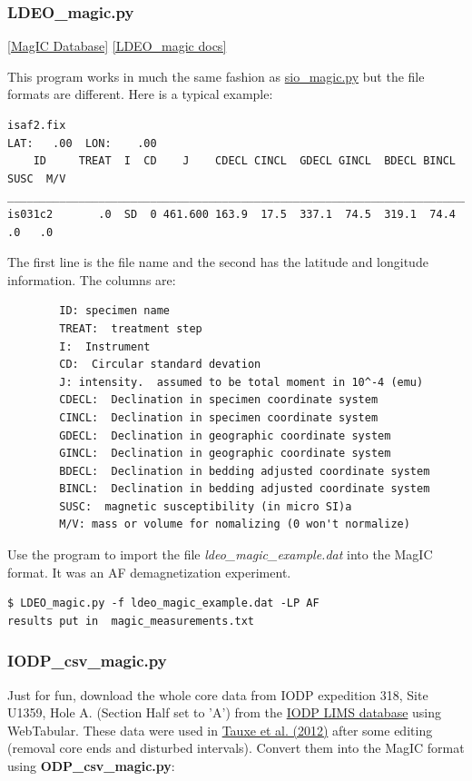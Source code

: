 \documentclass[11pt]{book}
\begin{document}
{{\subsubsection{LDEO\_magic.py}
\href{#MagICDatabase}{[MagIC Database]}
\href{https://github.com/PmagPy/PmagPy/blob/master/programs/LDEO_magic.py}{[LDEO\_magic docs]}


This program works in much the same fashion as \href{#sio_magic.py}{sio\_magic.py} but the file formats are different.  Here is a typical example:

\begin{verbatim}
isaf2.fix
LAT:   .00  LON:    .00
    ID     TREAT  I  CD    J    CDECL CINCL  GDECL GINCL  BDECL BINCL  SUSC  M/V
________________________________________________________________________________
is031c2       .0  SD  0 461.600 163.9  17.5  337.1  74.5  319.1  74.4    .0   .0
\end{verbatim}
The first line is the file name and the second has the latitude and longitude information. The columns are:
\begin{verbatim}
        ID: specimen name
        TREAT:  treatment step
        I:  Instrument
        CD:  Circular standard devation
        J: intensity.  assumed to be total moment in 10^-4 (emu)
        CDECL:  Declination in specimen coordinate system
        CINCL:  Declination in specimen coordinate system
        GDECL:  Declination in geographic coordinate system
        GINCL:  Declination in geographic coordinate system
        BDECL:  Declination in bedding adjusted coordinate system
        BINCL:  Declination in bedding adjusted coordinate system
        SUSC:  magnetic susceptibility (in micro SI)a
        M/V: mass or volume for nomalizing (0 won't normalize)
\end{verbatim}

Use the program to import the file {\it ldeo\_magic\_example.dat} into the MagIC format.  It was an AF demagnetization experiment.

\begin{verbatim}
$ LDEO_magic.py -f ldeo_magic_example.dat -LP AF
results put in  magic_measurements.txt
\end{verbatim}

\subsubsection{IODP\_csv\_magic.py}

Just for fun, download the whole core data from IODP expedition 318, Site U1359, Hole A. (Section Half set to 'A') from the \href{#LIMS}{IODP LIMS database} using WebTabular.    These data were used in \href{http://dx.doi.org/10.1029/2012PA002308}{Tauxe et al. (2012)} \nocite{tauxe12} after some editing (removal core ends and disturbed intervals).   Convert them into the MagIC format using {\bf ODP\_csv\_magic.py}:

}}
\end{document}
